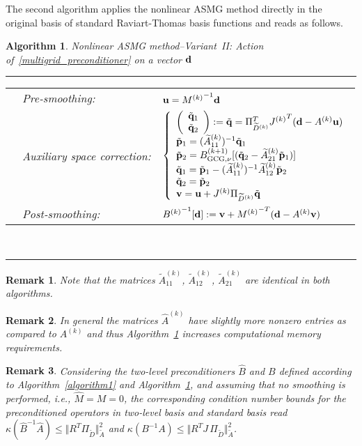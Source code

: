\documentclass[11pt]{amsart}
\numberwithin{equation}{section}
\newtheorem{remark}{Remark}[section]
\newtheorem{algorithm}{Algorithm}[section]
\theoremstyle{definition}\newtheorem{example}{Example}[section]
\begin{document}
The second algorithm applies the nonlinear ASMG method directly in the original basis of
standard Raviart-Thomas basis functions and reads as follows. 
\begin{algorithm}{Nonlinear ASMG method--Variant~II: Action of~\eqref{multigrid_preconditioner}
on a vector ${{\bf{{d}}}}$}\label{algorithm2} \\[-1ex]
\hrule \vspace{1ex}
\begin{tabular}{lll}
& Pre-smoothing: & ${{\bf{{u}}}} = {M^{(k)}}^{-1} {{\bf{{d}}}}$ \\
& Auxiliary space correction: & $\left\{
\begin{array}{l}
\left(\begin{array}{c} \tilde{{{\bf{{q}}}}}_1 \\ \tilde{{{\bf{{q}}}}}_2 \end{array}\right)
:=\tilde{{{\bf{{q}}}}} = \Pi_{\widetilde{D}^{(k)}}^T {J^{(k)}}^T ({{\bf{{d}}}} - A^{(k)} {{\bf{{u}}}}) \\
\tilde{{{\bf{{p}}}}}_1 = (\widetilde{A}^{(k)}_{11})^{-1} \tilde{{{\bf{{q}}}}}_1 \\
\tilde{{{\bf{{p}}}}}_2 = B^{(k+1)}_{{\rm GCG,\nu}}[(\tilde{{{\bf{{q}}}}}_2 -  \widetilde{A}^{(k)}_{21} \tilde{{{\bf{{p}}}}}_1)] \\
\tilde{{{\bf{{q}}}}}_1 = \tilde{{{\bf{{p}}}}}_1 - (\widetilde{A}^{(k)}_{11})^{-1} \widetilde{A}^{(k)}_{12} \tilde{{{\bf{{p}}}}}_2 \\
\tilde{{{\bf{{q}}}}}_2 = \tilde{{{\bf{{p}}}}}_2 \\
{{\bf{{v}}}} = {{\bf{{u}}}} +  J^{(k)} \Pi_{\widetilde{D}^{(k)}} \tilde{{{\bf{{q}}}}}
\end{array} \right.$ \\
& Post-smoothing: & ${B^{(k)}}^{-1}[{{\bf{{d}}}}] := {{\bf{{v}}}} + {M^{(k)}}^{-T} ({{\bf{{d}}}} - A^{(k)} {{\bf{{v}}}})$
\end{tabular}
\\[1ex]
\hrule
\end{algorithm}
\begin{remark}
Note that the matrices $\widetilde{A}^{(k)}_{11}$, $\widetilde{A}^{(k)}_{12}$,
$\widetilde{A}^{(k)}_{21}$ are identical in both algorithms. 
\end{remark}
\begin{remark}
In general the matrices $\widehat{A}^{(k)}$ have slightly
more nonzero entries as compared to $A^{(k)}$ and thus Algorithm~\ref{algorithm2}
increases computational memory requirements.
\end{remark}
\begin{remark}
Considering the two-level preconditioners $\widehat{B}$ and $B$ defined according
to Algorithm~\ref{algorithm1} and Algorithm~\ref{algorithm2}, and assuming that no
smoothing is performed, i.e., $\widehat{M}=M=0$, the corresponding condition number
bounds for the preconditioned operators in two-level basis and standard basis read
$\kappa(\widehat{B}^{-1}\widehat{A})\le \Vert R^T \Pi_{\widetilde{D}} \Vert^2_{\widetilde{A}}$
and
$\kappa(B^{-1}A)\le \Vert R^T J \, \Pi_{\widetilde{D}} \Vert^2_{\widetilde{A}}$.

\end{remark}
\end{document}
